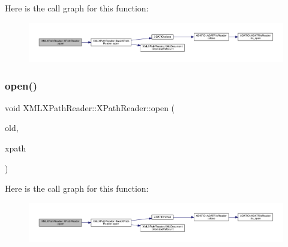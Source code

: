 Here is the call graph for this function\+:
\nopagebreak
\begin{figure}[H]
\begin{center}
\leavevmode
\includegraphics[width=350pt]{d3/d5a/classXMLXPathReader_1_1XPathReader_a55e38b40f720bb3622e3489561b1457c_cgraph}
\end{center}
\end{figure}
\mbox{\label{classXMLXPathReader_1_1XPathReader_a55e38b40f720bb3622e3489561b1457c}} 
\subsubsection{\texorpdfstring{open()}{open()}\hspace{0.1cm}{\footnotesize\ttfamily [6/6]}}
{\footnotesize\ttfamily void X\+M\+L\+X\+Path\+Reader\+::\+X\+Path\+Reader\+::open (\begin{DoxyParamCaption}\item[{\mbox{\hyperlink{classXMLXPathReader_1_1XPathReader}{X\+Path\+Reader}} \&}]{old,  }\item[{const std\+::string \&}]{xpath }\end{DoxyParamCaption})\hspace{0.3cm}{\ttfamily [inline]}}

Here is the call graph for this function\+:
\nopagebreak
\begin{figure}[H]
\begin{center}
\leavevmode
\includegraphics[width=350pt]{d3/d5a/classXMLXPathReader_1_1XPathReader_a55e38b40f720bb3622e3489561b1457c_cgraph}
\end{center}
\end{figure}
\mbox{\label{classXMLXPathReader_1_1XPathReader_a5505bd1ad902828907e2562947719fef}} 
